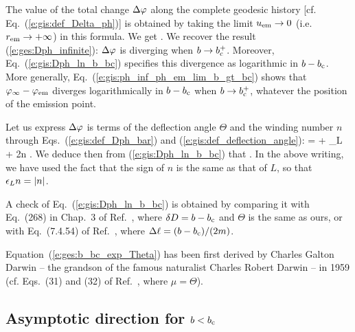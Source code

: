 The value of the total change $\Delta\varphi$ along the complete geodesic history
[cf. Eq.~(\ref{e:gis:def_Delta_ph})]
is obtained by taking the limit $u_{\rm em}\to 0$ (i.e. $r_{\rm em} \to +\infty$)
in this formula. We get
\be \label{e:gis:Dph_ln_b_bc}
    .
\ee
We recover the result (\ref{e:ges:Dph_infinite}): $\Delta\varphi$ is diverging
when $b\to b_{\rm c}^+$. Moreover, Eq.~(\ref{e:gis:Dph_ln_b_bc}) specifies
this divergence as logarithmic in $b - b_{\rm c}$. More generally,
Eq.~(\ref{e:gis:ph_inf_ph_em_lim_b_gt_bc}) shows that $\varphi_\infty - \varphi_{\rm em}$
diverges logarithmically in $b - b_{\rm c}$ when $b\to b_{\rm c}^+$, whatever the position
of the emission point.

Let us express $\Delta\varphi$ is terms of the deflection angle $\Theta$ and
the winding number $n$ through Eqs.~(\ref{e:gis:def_Dph_bar}) and
(\ref{e:gis:def_deflection_angle}):
\be
    \Delta\ph = \Theta + \eps_L \pi + 2\pi n .
\ee
We deduce then from (\ref{e:gis:Dph_ln_b_bc}) that
\be \label{e:ges:b_bc_exp_Theta}
   .
\ee
In the above writing, we have used the fact that the sign of $n$ is the same
as that of $L$, so that $\epsilon_L n = |n|$.
\begin{remark}
A check of Eq.~(\ref{e:gis:Dph_ln_b_bc}) is obtained by comparing it with
Eq.~(268) in Chap.~3 of Ref.~\cite{Chand83}, where $\delta D = b-b_{\rm c}$ and
$\Theta$ is the same as ours, or with Eq.~(7.4.54) of Ref.~\cite{FroloZ11},
where $\Delta\ell = (b - b_{\rm c})/(2 m)$.
\end{remark}

\begin{hist} \label{h:gis:Darwin_formula}
Equation~(\ref{e:ges:b_bc_exp_Theta}) has been first derived by
Charles Galton Darwin -- the grandson of the famous naturalist Charles Robert Darwin -- in 1959 \cite{Darwi59} (cf. Eqs.~(31) and (32) of Ref.~\cite{Darwi59}, where $\mu = \Theta$).
\end{hist}


\subsection{Asymptotic direction for $b < b_{\rm c}$}

